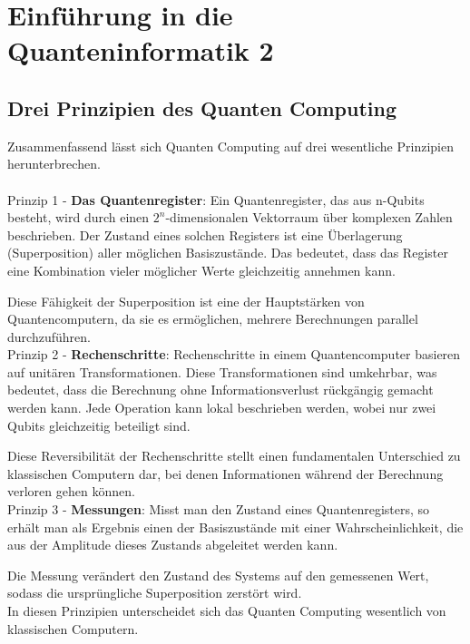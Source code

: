 \section{Einführung in die Quanteninformatik 2}
\label{sec:einfuehrung-in-die-quanteninformatik-2}

\subsection{Drei Prinzipien des Quanten Computing}
\label{subsec:drei-prinzipien-des-quanten-computing}

Zusammenfassend lässt sich Quanten Computing auf drei wesentliche Prinzipien herunterbrechen.\\\\
Prinzip 1 - \textbf{Das Quantenregister}: Ein Quantenregister, das aus n-Qubits besteht, wird durch einen $2^n$-dimensionalen Vektorraum über komplexen Zahlen beschrieben.
Der Zustand eines solchen Registers ist eine Überlagerung (Superposition) aller möglichen Basiszustände.
Das bedeutet, dass das Register eine Kombination vieler möglicher Werte gleichzeitig annehmen kann.

Diese Fähigkeit der Superposition ist eine der Hauptstärken von Quantencomputern, da sie es ermöglichen, mehrere Berechnungen parallel durchzuführen.\\

Prinzip 2 - \textbf{Rechenschritte}: Rechenschritte in einem Quantencomputer basieren auf unitären Transformationen.
Diese Transformationen sind umkehrbar, was bedeutet, dass die Berechnung ohne Informationsverlust rückgängig gemacht werden kann.
Jede Operation kann lokal beschrieben werden, wobei nur zwei Qubits gleichzeitig beteiligt sind.

Diese Reversibilität der Rechenschritte stellt einen fundamentalen Unterschied zu klassischen Computern dar, bei denen Informationen während der Berechnung verloren gehen können.\\

Prinzip 3 - \textbf{Messungen}: Misst man den Zustand eines Quantenregisters, so erhält man als Ergebnis einen der Basiszustände mit einer Wahrscheinlichkeit, die aus der Amplitude dieses Zustands abgeleitet werden kann.

Die Messung verändert den Zustand des Systems auf den gemessenen Wert, sodass die ursprüngliche Superposition zerstört wird.\\

In diesen Prinzipien unterscheidet sich das Quanten Computing wesentlich von klassischen Computern.\\


